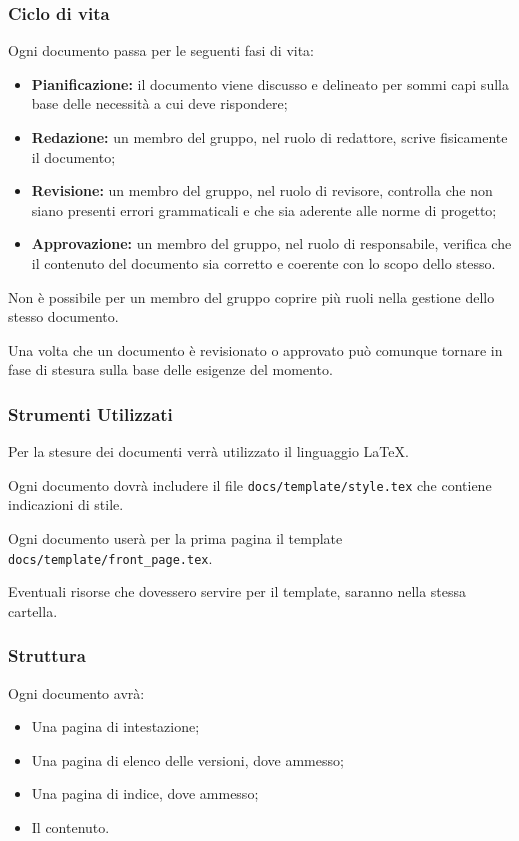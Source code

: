 \documentclass[a4paper, 12pt]{article}
\begin{document}
\subsubsection{Ciclo di vita}
Ogni documento passa per le seguenti fasi di vita:
\begin{itemize}
\item \textbf{Pianificazione:} il documento viene discusso e delineato per sommi capi sulla base delle necessità a cui deve rispondere;
\item \textbf{Redazione:} un membro del gruppo, nel ruolo di redattore, scrive fisicamente il documento;
\item \textbf{Revisione:} un membro del gruppo, nel ruolo di revisore, controlla che non siano presenti errori grammaticali e che sia aderente alle norme di progetto;
\item \textbf{Approvazione:} un membro del gruppo, nel ruolo di responsabile, verifica che il contenuto del documento sia corretto e coerente con lo scopo dello stesso.
\end{itemize}

Non è possibile per un membro del gruppo coprire più ruoli nella gestione dello stesso documento.

Una volta che un documento è revisionato o approvato può comunque tornare in fase di stesura sulla base delle esigenze del momento.

\subsubsection{Strumenti Utilizzati}
Per la stesure dei documenti verrà utilizzato il linguaggio \LaTeX.

Ogni documento dovrà includere il file \texttt{docs/template/style.tex} che contiene indicazioni di stile.

Ogni documento userà per la prima pagina il template \texttt{docs/template/front\_page.tex}.

Eventuali risorse che dovessero servire per il template, saranno nella stessa cartella.
\subsubsection{Struttura}
Ogni documento avrà:
\begin{itemize}
\item Una pagina di intestazione;
\item Una pagina di elenco delle versioni, dove ammesso;
\item Una pagina di indice, dove ammesso;
\item Il contenuto.
\end{itemize}
\end{document}
